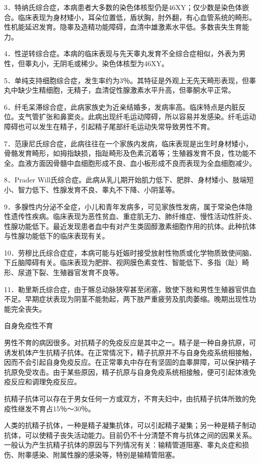\documentclass[12pt,UTF8,openany]{ctexbook}
\begin{document}
3．特纳氏综合症，本病患者大多数的染色体核型仍是46XY；仅少数是染色体嵌合。临床表现为身材矮小，耳朵位置低，盾状胸，肘外翻，有心血管系统的畸形。性机能延迟发育。隐睾及造精功能障碍，血清中雄激素水平低。多数丧失生育能力。

4．性逆转综合症。本病的临床表现与先天睾丸发育不全综合症相似，外表为男性，但睾丸小，无阴毛或稀少。染色体核型为46XY。

5．单纯支持细胞综合症，发生率约为3％。其特征是外观上无先天畸形表现，但睾丸中缺少生精细胞，无精子，血清促性腺激素水平升高，但睾酮水平正常。

6．纤毛呆滞综合症，此病家族史为近亲结婚多，发病率高。临床特点是内脏反位。支气管扩张和鼻窦炎。此病出现纤毛运动障碍，所以容易并发感染。纤毛运动障碍也可以发生在精子，引起精子尾部纤毛运动失常导致男性不育。

7．范康尼氏综合症，此病往往在一个家族内发病，临床表现是出生时身材矮小，骨骼发育畸形，如拇指缺损，指趾畸形及色素沉着等；生殖器发育不良，性功能不全。血液方面因骨髓中血细胞形成不良、血小板形成不良而表现为全血细胞减少。

8．Prader Will氏综合症。此病从乳儿期开始肌力低下、肥胖、身材矮小、肢端短小、智力低下、性腺发育不良、睾丸不下降、小阴茎等。

9．多腺性内分泌不全症，小儿和青年发病多，可见家族性发病，属于常染色体隐性遗传性疾病。临床表现为恶性贫血、重症肌无力、肺纤维症、慢性活动性肝炎、性腺功能低下。最近发现患者血中有对产生类固醇激素细胞作用的抗体。此种抗体与性腺功能低下的临床表现有关。

10．劳穆比氏综合症症，本病可能与妊娠时接受放射性物质或化学物质致使间脑、下丘脑障碍有关。临床表现为肥胖、视网膜色素变性、智能低下、多指（趾）畸形、尿道下裂、生殖器官发育不良等。

11．勒里斯氏综合症，由于髂总动脉狭窄甚至闭塞，致使下肢和男性生殖器官供血不足。早期症状表现为阴茎不能勃起，两下肢严重疲劳及肌肉萎缩。晚期出现性功能完全丧失。





自身免疫性不育


男性不育的病因很多。对抗精子的免疫反应是其中之一。精子是一种自身抗原，可诱发机体产生抗精子抗体。在正常情况下，精子抗原并不与自身免疫系统相接触，因而不会引起自身免疫反应。在正常睾丸中存在有坚固的血睾屏障，可以保护精子抗原免受攻击。由于某些原因，精子抗原与自身免疫系统相接触，便可引起体液免疫反应和调理免疫反应。

抗精子抗体可以存在于男女任何一方或双方，不育夫妇中，由抗精子抗体所致的免疫性继发不育占15％～30％。

人类的抗精子抗体，一种是精子凝集抗体，可以引起精子凝集；另一种是精子制动抗体，可以使精子丧失活动能力。目前仍不十分清楚不育与抗体之间的因果关系。一般认为产生抗精子抗体的原因与下列情况有关：输精管道阻塞、睾丸炎症和损伤、附睾感染、附属性腺的感染等，特别是输精管阻塞。
\end{document}
